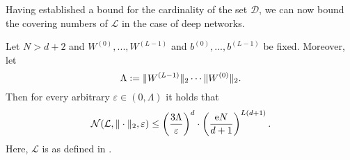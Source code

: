 Having established a bound for the cardinality of the set $\mathscr{D}$, we can now bound the covering numbers of $\mathcal{L}$ in the case of deep networks. 
\begin{lemma}\label{lem:cov_bound}
Let $N > d+2$ and $W^{(0)},..., W^{(L-1)}$ and $b^{(0)}, ..., b^{(L-1)}$ be fixed. Moreover, let
\begin{equation*}
\Lambda \mathrel{\mathop:}= \Vert W^{(L-1)} \Vert_2 \cdots \Vert W^{(0)} \Vert_2.
\end{equation*}
Then for every arbitrary $\varepsilon \in (0, \Lambda)$ it holds that
\begin{equation*}
\mathcal{N}(\mathcal{L}, \Vert \cdot \Vert_2, \varepsilon) \leq \left(\frac{3 \Lambda}{\varepsilon} \right)^d \cdot \left(\frac{\mathrm{e} N}{d+1}\right)^{L(d+1)}.
\end{equation*}
Here, $\mathcal{L}$ is as defined in . 
\end{lemma}
